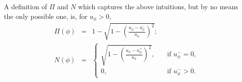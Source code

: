 \documentclass{sig-alternate}
\begin{document}
A definition of $\Pi$ and $N$ which captures the above intuitions, but by no means
the only possible one, is, for $u_\phi > 0$,
\begin{eqnarray}
  \label{eq:possibility}
  \Pi(\phi) &=& 1 - \sqrt{1 - \left(\frac{u_\phi - u_\phi^-}{u_\phi}\right)^2}; \\
  \label{eq:necessity}
  N(\phi) &=& \left\{\begin{array}{ll}
    \sqrt{1 - \left(\frac{u_\phi - u_\phi^+}{u_\phi}\right)^2},\quad & \mbox{if $u_\phi^- = 0$,}\\[1.5em]
    0, & \mbox{if $u_\phi^- > 0$.}
  \end{array}\right.
\end{eqnarray}
%


\end{document}
